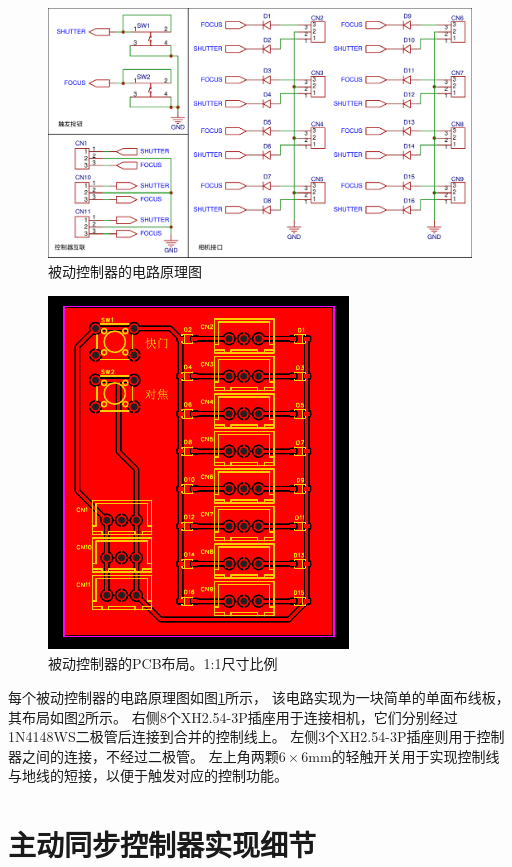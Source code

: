 \begin{figure}
    \includegraphics[width=\textwidth]{figures/passive_sync_schematic}
    \caption{被动控制器的电路原理图}
    \label{fig:passive_sync_schematic}
\end{figure}
\begin{figure}
    \centering
    \includegraphics{figures/passive_sync_pcb}
    \caption[被动控制器的PCB布局]{被动控制器的PCB布局。1:1尺寸比例}
    \label{fig:passive_sync_pcb}
\end{figure}
每个被动控制器的电路原理图如图\ref{fig:passive_sync_schematic}所示，
该电路实现为一块简单的单面布线板，其布局如图\ref{fig:passive_sync_pcb}所示。
右侧8个XH2.54-3P插座用于连接相机，它们分别经过1N4148WS二极管后连接到合并的控制线上。
左侧3个XH2.54-3P插座则用于控制器之间的连接，不经过二极管。
左上角两颗$6\times 6$mm的轻触开关用于实现控制线与地线的短接，以便于触发对应的控制功能。


\chapter{主动同步控制器实现细节}
\label{app:active_sync}

